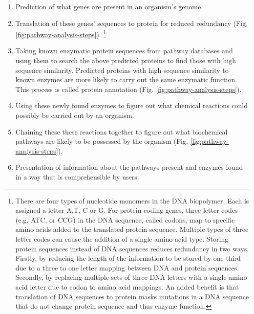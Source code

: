 \begin{enumerate}
\item Prediction of what genes are present in an organism's genome.
\item Translation of these genes' sequences to protein for reduced redundancy (Fig. \ref{fig:pathway-analysis-steps}). \footnote{There are four types of nucleotide monomers in the DNA biopolymer. Each is assigned a letter A,T, C or G. For protein coding genes, three letter codes (e.g. ATC, or CCG) in the DNA sequence, called codons, map to specific amino acids added to the translated protein sequence. Multiple types of three letter codes can cause the addition of a single amino acid type. Storing protein sequences instead of DNA sequences reduces redundancy in two ways. Firstly, by reducing the length of the information to be stored by one third due to a three to one letter mapping between DNA and protein sequences. Secondly, by replacing multiple sets of three DNA letters with a single amino acid letter due to codon to amino acid mappings. An added benefit is that translation of DNA sequences to protein masks mutations in a DNA sequence that do not change protein sequence and thus enzyme function.} 
\item Taking known enzymatic protein sequences from pathway databases and using them to search the above predicted proteins to find those with high sequence similarity. Predicted proteins with high sequence similarity to known enzymes are more likely to carry out the same enzymatic function. This process is called protein annotation (Fig. \ref{fig:pathway-analysis-steps}).
\item Using these newly found enzymes to figure out what chemical reactions could possibly be carried out by an organism.
\item Chaining these these reactions together to figure out what biochemical pathways are likely to be possessed by the organism (Fig. \ref{fig:pathway-analysis-steps}).
\item Presentation of information about the pathways present and enzymes found in a way that is comprehensible by users.
\end{enumerate}

